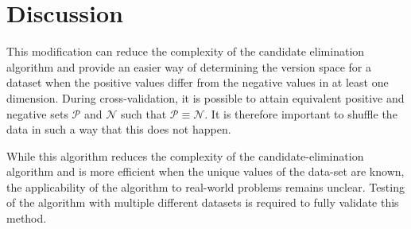\section{Discussion}

This modification can reduce the complexity of the candidate elimination algorithm and provide an easier way of determining the version space for a dataset when the positive values differ from the negative values in at least one dimension.  During cross-validation, it is possible to attain equivalent positive and negative sets $\mathcal{P}$ and $\mathcal{N}$ such that $\mathcal{P} \equiv \mathcal{N}$.  It is therefore important to shuffle the data in such a way that this does not happen.

While this algorithm reduces the complexity of the candidate-elimination algorithm and is more efficient when the unique values of the data-set are known, the applicability of the algorithm to real-world problems remains unclear.  Testing of the algorithm with multiple different datasets is required to fully validate this method.









